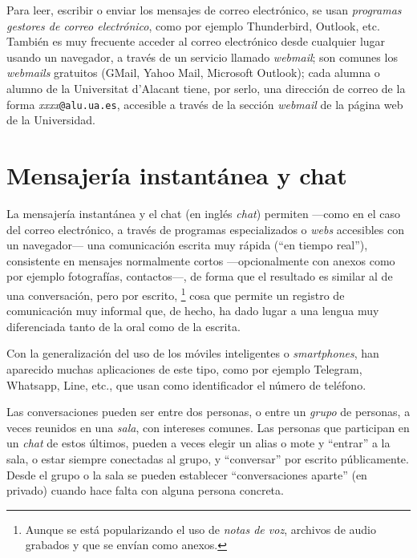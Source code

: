 Para leer, escribir o enviar los mensajes de correo electrónico, se usan \emph{programas gestores de correo electrónico}, como por ejemplo Thunderbird, Outlook, etc. También es muy frecuente acceder al correo electrónico desde cualquier lugar usando un navegador, a través de un servicio llamado \emph{webmail}; son comunes los \emph{webmails} gratuitos (GMail, Yahoo Mail, Microsoft Outlook); cada alumna o alumno de la Universitat d'Alacant tiene, por serlo, una dirección de correo de la forma \emph{xxxx}\texttt{@alu.ua.es}, accesible a través de la sección \emph{webmail} de la página web de la Universidad. 

\section{Mensajería instantánea y chat} \label{ss:missinst} La mensajería instantánea y el chat (en inglés \emph{chat}) permiten ---como en el caso del correo electrónico, a través de programas especializados o \emph{webs} accesibles con un navegador--- una comunicación escrita muy rápida (``en tiempo real''), consistente en mensajes normalmente cortos ---opcionalmente con anexos como por ejemplo fotografías, contactos---, de forma que el resultado es similar al de una conversación, pero por escrito, \footnote{Aunque se está popularizando el uso de \emph{notas de voz}, archivos de audio grabados y que se envían como anexos.} cosa que permite un registro de comunicación muy informal que, de hecho, ha dado lugar a una lengua muy diferenciada tanto de la oral como de la escrita. 

Con la generalización del uso de los móviles inteligentes o \emph{smartphones}, han aparecido muchas aplicaciones de este tipo, como por ejemplo Telegram, Whatsapp, Line, etc., que usan como identificador el número de teléfono. 

Las conversaciones pueden ser entre dos personas, o entre un \emph{grupo} de personas, a veces reunidos en una \emph{sala}, con intereses comunes. Las personas que participan en un \emph{chat} de estos últimos, pueden a veces elegir un alias o mote y ``entrar'' a la sala, o estar siempre conectadas al grupo, y ``conversar'' por escrito públicamente. Desde el grupo o la sala se pueden establecer ``conversaciones aparte'' (en privado) cuando hace falta con alguna persona concreta. 

